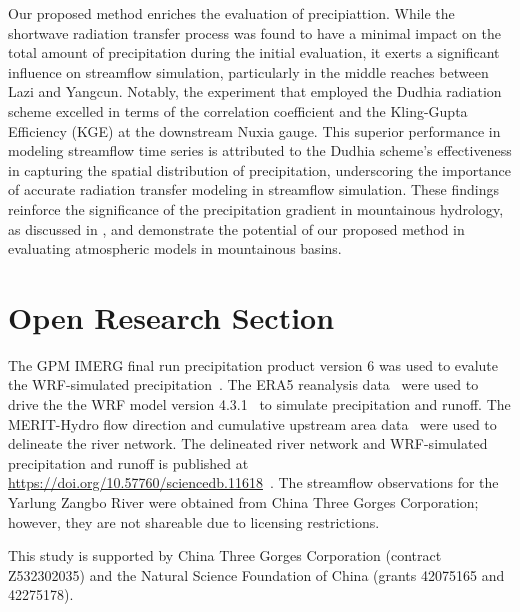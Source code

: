 \documentclass[draft]{agujournal2019}
\begin{document}
Our proposed method enriches the evaluation of precipiattion. While the shortwave radiation transfer process was found to have a minimal impact on the total amount of precipitation during the initial evaluation, it exerts a significant influence on streamflow simulation, particularly in the middle reaches between Lazi and Yangcun. Notably, the experiment that employed the Dudhia radiation scheme excelled in terms of the correlation coefficient and the Kling-Gupta Efficiency (KGE) at the downstream Nuxia gauge. This superior performance in modeling streamflow time series is attributed to the Dudhia scheme's effectiveness in capturing the spatial distribution of precipitation, underscoring the importance of accurate radiation transfer modeling in streamflow simulation. These findings reinforce the significance of the precipitation gradient in mountainous hydrology, as discussed in \cite{immerzeel2014WRR}, and demonstrate the potential of our proposed method in evaluating atmospheric models in mountainous basins.

\section*{Open Research Section}

The GPM IMERG final run precipitation product version 6 was used to evalute the WRF-simulated precipitation~\cite{huffman2019GPM}. The ERA5 reanalysis data~\cite{hersbach2020QJRMS} were used to drive the the WRF model version 4.3.1~\cite{powers2017BAMS} to simulate precipitation and runoff. The MERIT-Hydro flow direction and cumulative upstream area data~\cite{yamazaki2019WRR} were used to delineate the river network. The delineated river network and WRF-simulated precipitation and runoff is published at \url{https://doi.org/10.57760/sciencedb.11618}~\cite{zheng2024SCB}. The streamflow observations for the Yarlung Zangbo River were obtained from China Three Gorges Corporation; however, they are not shareable due to licensing restrictions.

\acknowledgments

This study is supported by China Three Gorges Corporation (contract Z532302035) and the Natural Science Foundation of China (grants 42075165 and 42275178).


\end{document}
